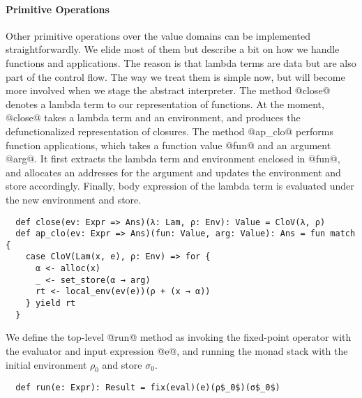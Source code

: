 \paragraph{Primitive Operations}
Other primitive operations over the value domains can be implemented
straightforwardly. We elide most of them but describe a bit on how we handle
functions and applications. The reason is that lambda terms are data but are also
part of the control flow. The way we treat them is simple now, but
will become more involved when we stage the abstract interpreter.
The method @close@ denotes a lambda term to our representation of functions.
At the moment, @close@ takes a lambda term and an environment, and
produces the defunctionalized representation of closures.
The method @ap_clo@ performs function applications, which takes a function
value @fun@ and an argument @arg@. It first extracts the lambda term and environment
enclosed in @fun@, and allocates an addresses for the argument and updates the
environment and store accordingly.  Finally, body expression of the lambda term
is evaluated under the new environment and store.
\begin{lstlisting}
  def close(ev: Expr => Ans)(λ: Lam, ρ: Env): Value = CloV(λ, ρ)
  def ap_clo(ev: Expr => Ans)(fun: Value, arg: Value): Ans = fun match {
    case CloV(Lam(x, e), ρ: Env) => for {
      α <- alloc(x)
      _ <- set_store(α → arg)
      rt <- local_env(ev(e))(ρ + (x → α))
    } yield rt
  }
\end{lstlisting}


We define the top-level @run@ method as invoking the fixed-point operator with
the evaluator and input expression @e@, and running the monad stack with the
initial environment $\rho_0$ and store $\sigma_0$.
\begin{lstlisting}
  def run(e: Expr): Result = fix(eval)(e)(ρ$_0$)(σ$_0$)
\end{lstlisting}
